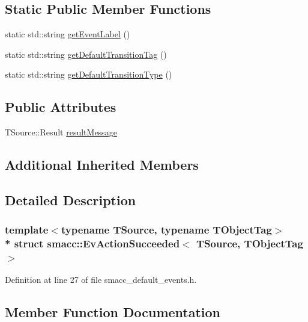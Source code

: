 \subsection*{Static Public Member Functions}
\begin{DoxyCompactItemize}
\item 
static std\+::string \hyperlink{structsmacc_1_1EvActionSucceeded_a8072fd41e4f5aa3302cca648ad842bf1}{get\+Event\+Label} ()
\item 
static std\+::string \hyperlink{structsmacc_1_1EvActionSucceeded_adef22fa07dc743bb64255c7575e81993}{get\+Default\+Transition\+Tag} ()
\item 
static std\+::string \hyperlink{structsmacc_1_1EvActionSucceeded_a2e2644bcf8d7e03add94a30091d72732}{get\+Default\+Transition\+Type} ()
\end{DoxyCompactItemize}
\subsection*{Public Attributes}
\begin{DoxyCompactItemize}
\item 
T\+Source\+::\+Result \hyperlink{structsmacc_1_1EvActionSucceeded_a6f040ef9c80080c840a10cd0603fdf33}{result\+Message}
\end{DoxyCompactItemize}
\subsection*{Additional Inherited Members}


\subsection{Detailed Description}
\subsubsection*{template$<$typename T\+Source, typename T\+Object\+Tag$>$\\*
struct smacc\+::\+Ev\+Action\+Succeeded$<$ T\+Source, T\+Object\+Tag $>$}



Definition at line 27 of file smacc\+\_\+default\+\_\+events.\+h.



\subsection{Member Function Documentation}
